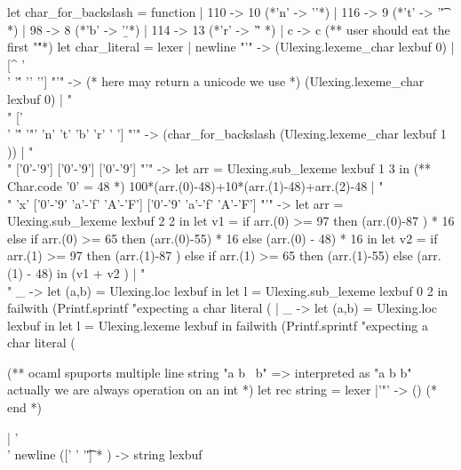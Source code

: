 \begin{enumerate}
\begin{enumerate}
\begin{bluecode}
let char_for_backslash = function 
  | 110 ->  10 (*'n' -> '\n'*)
  | 116 -> 9   (*'t' -> '\t' *)
  | 98  -> 8   (*'b' -> '\b'*)
  | 114 -> 13  (*'r' -> '\r' *)
  | c -> c 
(** user should eat the first "\'"*)
let char_literal = lexer 
  | newline "'" -> 
    (Ulexing.lexeme_char lexbuf 0) 
  |  [^ '\\' '\'' '' ''] "'" -> 
    (* here may return a unicode we use *)
    (Ulexing.lexeme_char lexbuf 0)
  | "\\" ['\\' '\'' '"' 'n' 't' 'b' 'r' ' '] "'" -> 
    (char_for_backslash (Ulexing.lexeme_char lexbuf 1 ))
  | "\\" ['0'-'9'] ['0'-'9'] ['0'-'9'] "'" -> 
    let arr = Ulexing.sub_lexeme lexbuf 1 3 in 
    (** Char.code '0' = 48 *)
    100*(arr.(0)-48)+10*(arr.(1)-48)+arr.(2)-48
  | "\\" 'x' ['0'-'9' 'a'-'f' 'A'-'F'] ['0'-'9' 'a'-'f' 'A'-'F'] "'" -> 
    let arr = Ulexing.sub_lexeme lexbuf 2 2 in 
    let v1 = 
      if arr.(0) >= 97 
      then (arr.(0)-87 ) * 16 
      else if arr.(0) >= 65 
      then (arr.(0)-55) * 16 
      else (arr.(0) - 48) * 16 in
    let v2 = 
      if arr.(1) >= 97 
      then (arr.(1)-87 ) 
      else if arr.(1) >= 65 
      then (arr.(1)-55) 
      else (arr.(1) - 48) in 
    (v1 + v2 )
  | "\\" _ -> 
    let (a,b) = Ulexing.loc lexbuf in 
    let l = Ulexing.sub_lexeme lexbuf 0 2  in
    failwith 
    (Printf.sprintf 
       "expecting a char literal (%
  | _ -> 
    let (a,b) = Ulexing.loc lexbuf in 
    let l = Ulexing.lexeme lexbuf in
    failwith 
    (Printf.sprintf 
       "expecting a char literal (%
       
(** ocaml spuports multiple line string "a b \ 
    b" => interpreted as "a b b"
    actually we are always operation on an int 
*)
let rec string = lexer 
  |'"' -> () (* end *)
   
  | '\\' newline ([' ' '\t'] * ) -> 
        string lexbuf


\end{bluecode}
\end{enumerate}
\end{enumerate}
